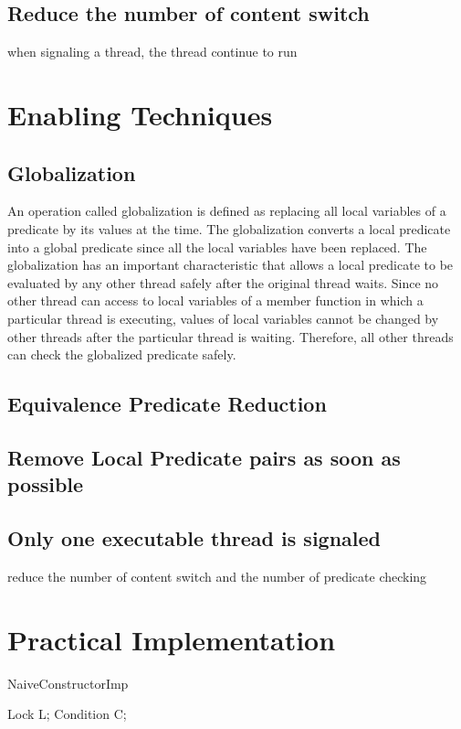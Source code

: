 \documentclass[preprint]{sigplanconf}
\begin{document}
\subsection{Reduce the number of content switch}
when signaling a thread, the thread continue to run

\section{Enabling Techniques}

\subsection{Globalization}
An operation called globalization is defined as replacing all local variables of
a predicate by its values at the time. The globalization converts a local 
predicate into a global predicate since all the local variables have been 
replaced. The globalization has an important characteristic that allows a
local predicate to be evaluated by any other thread safely after the original
thread waits. Since no other thread can access to local variables of a member 
function in which a particular thread is executing, values of local variables 
cannot be changed by other threads after the particular thread is waiting. 
Therefore, all other threads can check the globalized predicate safely. 


\subsection{Equivalence Predicate Reduction}

\subsection{Remove Local Predicate pairs as soon as possible}

\subsection{Only one executable thread is signaled}
reduce the number of content switch and the number of predicate checking 


\section{Practical Implementation} \label{sec:imp}

\begin{SaveVerbatim}{NaiveConstructorImp}

Lock L;
Condition C;
\end{SaveVerbatim}
\end{document}
